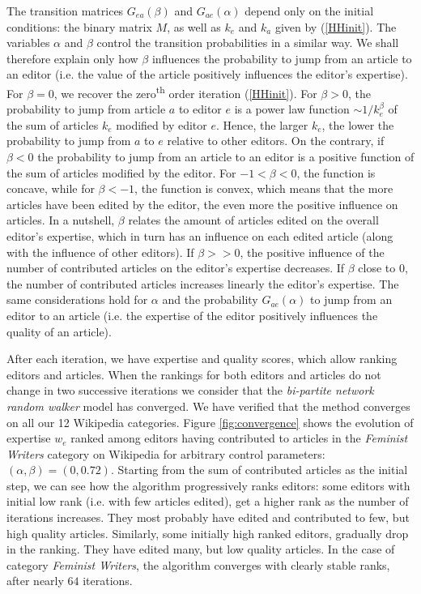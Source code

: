 The transition matrices $G_{ea}(\beta)$ and $G_{ae}(\alpha)$ depend only on the initial conditions: the binary matrix $M$, as well as $k_e$ and $k_a$ given by (\ref{HHinit}). The variables $\alpha$ and $\beta$ control the transition probabilities in a similar way. We shall therefore explain only how $\beta$ influences the probability to jump from an article to an editor (i.e. the value of the article positively influences the editor's expertise). For $\beta = 0$, we recover the zero\textsuperscript{th} order iteration (\ref{HHinit}). For $\beta > 0$, the probability to jump from article $a$ to editor $e$ is a power law function $\sim 1/k_{e}^{\beta}$ of the sum of articles $k_{e}$  modified by editor $e$. Hence, the larger $k_{e}$, the lower the probability to jump from $a$ to $e$ relative to other editors. On the contrary, if $\beta < 0$ the probability to jump from an article to an editor is a positive function of the sum of articles modified by the editor. For $-1 < \beta < 0$, the function is concave, while for $\beta < -1$, the function is convex, which means that the more articles have been edited by the editor, the even more the positive influence on articles. In a nutshell, $\beta$ relates the amount of articles edited on the overall editor's expertise, which in turn has an influence on each edited article (along with the influence of other editors). If $\beta >> 0$, the positive influence of the number of contributed articles on the editor's expertise decreases. If $\beta$ close to $0$, the number of contributed articles increases linearly the editor's expertise. The same considerations hold for $\alpha$ and the probability $G_{ae}(\alpha)$ to jump from an editor to an article (i.e. the expertise of the editor positively influences the quality of an article).

After each iteration, we have expertise and quality scores, which allow ranking editors and articles. When the rankings for both editors and articles do not change in two successive iterations we consider that the {\it bi-partite network random walker} model has converged. We have verified that the method converges on all our 12 Wikipedia categories.  Figure \ref{fig:convergence} shows the evolution of expertise $w_e$ ranked among editors having contributed to articles in the {\it Feminist Writers} category on Wikipedia for arbitrary control parameters: $(\alpha,\beta) =(0, 0.72)$. Starting from the sum of contributed articles as the initial step, we can see how the algorithm progressively ranks editors: some editors with initial low rank (i.e. with few articles edited), get a higher rank as the number of iterations increases. They most probably have edited and contributed to few, but high quality articles. Similarly, some initially high ranked editors, gradually drop in the ranking. They have edited many, but low quality articles. In the case of category {\it Feminist Writers}, the algorithm converges with clearly stable ranks, after nearly $64$ iterations.


